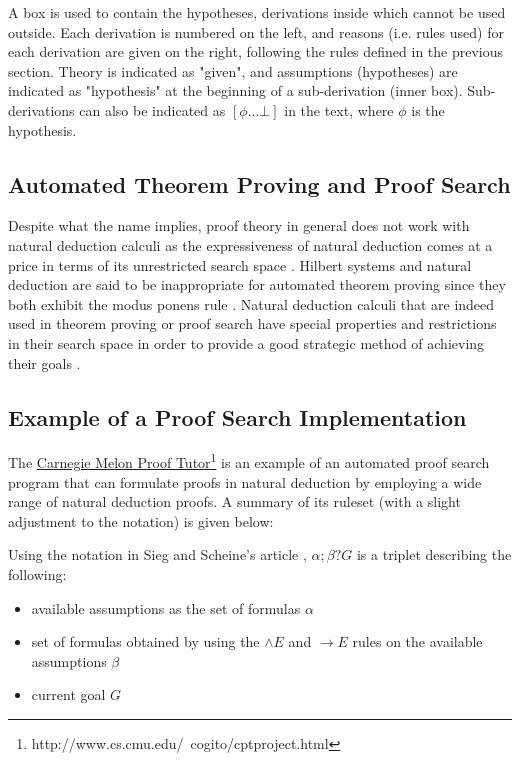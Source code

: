 \documentclass[11pt,twoside,a4paper]{report}
\begin{document}
A box is used to contain the hypotheses, derivations inside which cannot be used outside. Each derivation is numbered on the left, and reasons (i.e. rules used) for each derivation are given on the right, following the rules defined in the previous section. Theory is indicated as "given", and assumptions (hypotheses) are indicated as "hypothesis" at the beginning of a sub-derivation (inner box). Sub-derivations can also be indicated as $[\phi ... \bot]$ in the text, where $\phi$ is the hypothesis.

\subsection{Automated Theorem Proving and Proof Search}
Despite what the name implies, proof theory in general does not work with natural deduction calculi as the expressiveness of natural deduction comes at a price in terms of its unrestricted search space \citep*[pp. 140-141]{siegfried}. Hilbert systems and natural deduction are said to be inappropriate for automated theorem proving since they both exhibit the modus ponens rule \citep*[p. 95]{autobots}. Natural deduction calculi that are indeed used in theorem proving or proof search have special properties and restrictions in their search space in order to provide a good strategic method of achieving their goals \citep*[pp. 140-141]{siegfried}.

\subsection{Example of a Proof Search Implementation}
The \href{http://www.cs.cmu.edu/~cogito/cptproject.html}{Carnegie Melon Proof Tutor}\footnote{http://www.cs.cmu.edu/~cogito/cptproject.html} is an example of an automated proof search program that can formulate proofs in natural deduction by employing a wide range of natural deduction proofs. A summary of its ruleset (with a slight adjustment to the notation) is given below:

Using the notation in Sieg and Scheine's article \citep{siegfried}, $\alpha;\beta?G$ is a triplet describing the following:
\begin{itemize}
\item
available assumptions as the set of formulas $\alpha$
\item
set of formulas obtained by using the $\wedge E$ and $\rightarrow E$ rules on the available assumptions $\beta$
\item
current goal $G$
\end{itemize}
\end{document}
